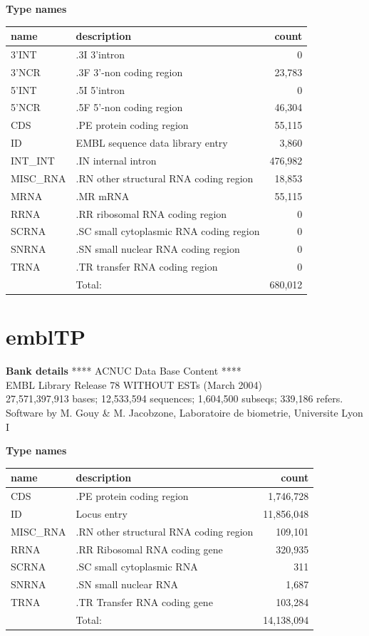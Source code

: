 \documentclass{article}
\begin{document}
\begin{Schunk}
\textbf{Type names}
\noindent\begin{tabular}{llr}
\hline \hline
name & description & count \\
\hline
3'INT  &  .3I 3'intron  &  0 \\
3'NCR  &  .3F  3'-non coding region  &  23,783 \\
5'INT  &  .5I 5'intron  &  0 \\
5'NCR  &  .5F  5'-non coding region  &  46,304 \\
CDS  &  .PE protein coding region  &  55,115 \\
ID  &  EMBL sequence data library entry  &  3,860 \\
INT\_INT  &  .IN  internal intron  &  476,982 \\
MISC\_RNA  &  .RN other structural RNA coding region  &  18,853 \\
MRNA  &  .MR mRNA  &  55,115 \\
RRNA  &  .RR ribosomal RNA coding region  &  0 \\
SCRNA  &  .SC small cytoplasmic RNA coding region  &  0 \\
SNRNA  &  .SN small nuclear RNA coding region  &  0 \\
TRNA  &  .TR transfer RNA coding region  &  0 \\
\hline
 & Total: & 680,012 \\
\hline \hline
\end{tabular}

\section{ emblTP }
\textbf{Bank details}
             ****     ACNUC Data Base Content      ****                         \\
              EMBL Library Release 78 WITHOUT ESTs  (March 2004)\\
27,571,397,913 bases; 12,533,594 sequences; 1,604,500 subseqs; 339,186 refers.\\
Software by M. Gouy \& M. Jacobzone, Laboratoire de biometrie, Universite Lyon I 

\textbf{Type names}
\noindent\begin{tabular}{llr}
\hline \hline
name & description & count \\
\hline
CDS  &  .PE protein coding region  &  1,746,728 \\
ID  &  Locus entry  &  11,856,048 \\
MISC\_RNA  &  .RN other structural RNA coding region  &  109,101 \\
RRNA  &  .RR Ribosomal RNA coding gene  &  320,935 \\
SCRNA  &  .SC small cytoplasmic RNA  &  311 \\
SNRNA  &  .SN small nuclear RNA  &  1,687 \\
TRNA  &  .TR Transfer RNA coding gene  &  103,284 \\
\hline
 & Total: & 14,138,094 \\
\hline \hline
\end{tabular}


\end{Schunk}
\end{document}
